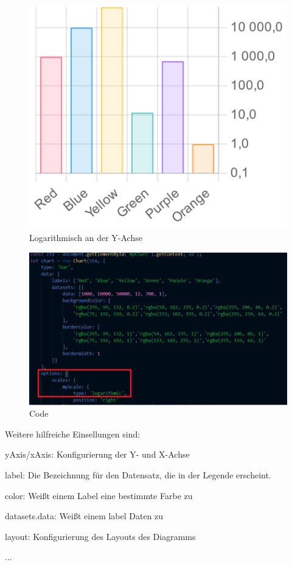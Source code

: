 \begin{figure}[H]
    \centering
    \includegraphics[scale=0.3]{pics/logChart.png}
    \caption{Logarithmisch an der Y-Achse}
\end{figure}
\begin{figure}[H]
    \centering
    \includegraphics[scale=0.7]{pics/logCode.png}
    \caption{Code}
\end{figure}


Weitere hilfreiche Einsellungen sind:
\begin{compactitem}
    \item yAxis/xAxis: Konfigurierung der Y- und X-Achse
    \item label: Die Bezeichnung für den Datensatz, die in der Legende erscheint.
    \item color: Weißt einem Label eine bestimmte Farbe zu
    \item datasets.data: Weißt einem label Daten zu
    \item layout: Konfigurierung des Layouts des Diagramms
    \item ...
\end{compactitem}

